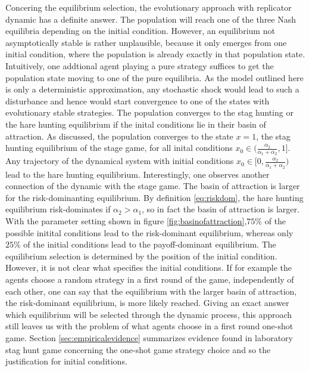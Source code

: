 \documentclass[11pt]{article}
\begin{document}
Concering the equilibrium selection, the evolutionary approach with replicator
dynamic has a definite answer. The population will reach one of the three
Nash equilibria depending on the initial condition. 
However, an equilibrium not asymptotically stable is rather unplausible,
because it only emerges from one initial condition, where the population
is already exactly in that population state. 
Intuitively, one addtional agent playing
a pure strategy suffices to get the population state moving to one of the
pure equilibria. As the model outlined here is only a deterministic
approximation, any stochastic shock would lead to such a disturbance and hence
would start convergence to one of the states with evolutionary stable 
strategies.
The population converges to the stag hunting or the hare
hunting equilibrium if the inital conditions lie in their basin of attraction.
As discussed, the population converges to the state $x=1$, the stag hunting 
equilibrium of the stage game, for all inital conditions 
$x_0 \in (\frac{\alpha_2}{\alpha_1+\alpha_2},1]$. Any trajectory of the 
dynamical system with initial conditions 
$x_0 \in [0,\frac{\alpha_2}{\alpha_1+\alpha_2})$ lead to the hare hunting
equilibrium. Interestingly, one observes another connection of the 
dynamic with the stage game. The basin of attraction is larger for the
risk-dominanting equilibrium. By definition \eqref{eq:riskdom}, 
the hare hunting equilibrium risk-dominates if $\alpha_2 > \alpha_1$,
so in fact the basin of attraction is larger. With the parameter setting shown
in figure \ref{fig:basinofattraction},$75\%$ of the possible initital 
conditions lead to the risk-dominant equilibrium, whereas only $25\%$ of the 
initial conditions lead to the payoff-dominant equilibrium. 
The equilibrium selection is determined by the position of the initial
condition. However, it is not clear what specifies the initial conditions. 
If for example the agents choose a random strategy in a first round of the 
game, independently of each other, one can say that the equilibrium with the
larger basin of attraction, the risk-dominant equilibrium, is more likely 
reached.  
Giving an exact answer which equilibrium will be selected through the dynamic
process, this approach still leaves us with the problem of what agents 
choose in a first round one-shot game. Section \ref{sec:empiricalevidence} 
summarizes evidence found in laboratory stag hunt game concerning the 
one-shot game strategy choice and so the justification for initial conditions.
\end{document}
